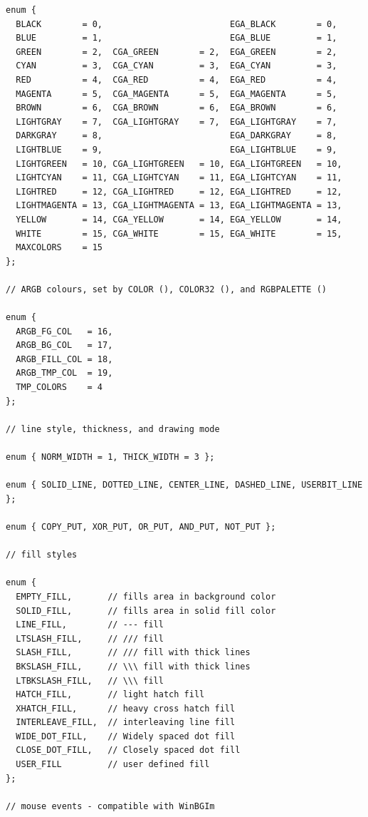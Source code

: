 \documentclass[a4paper,12pt]{article}
\begin{document}
\begin{small}
\begin{spacing}{0.85}
\begin{verbatim}
enum {
  BLACK        = 0,                         EGA_BLACK        = 0,
  BLUE         = 1,                         EGA_BLUE         = 1,
  GREEN        = 2,  CGA_GREEN        = 2,  EGA_GREEN        = 2,
  CYAN         = 3,  CGA_CYAN         = 3,  EGA_CYAN         = 3,
  RED          = 4,  CGA_RED          = 4,  EGA_RED          = 4,
  MAGENTA      = 5,  CGA_MAGENTA      = 5,  EGA_MAGENTA      = 5,
  BROWN        = 6,  CGA_BROWN        = 6,  EGA_BROWN        = 6,
  LIGHTGRAY    = 7,  CGA_LIGHTGRAY    = 7,  EGA_LIGHTGRAY    = 7,
  DARKGRAY     = 8,                         EGA_DARKGRAY     = 8,
  LIGHTBLUE    = 9,                         EGA_LIGHTBLUE    = 9,
  LIGHTGREEN   = 10, CGA_LIGHTGREEN   = 10, EGA_LIGHTGREEN   = 10,
  LIGHTCYAN    = 11, CGA_LIGHTCYAN    = 11, EGA_LIGHTCYAN    = 11,
  LIGHTRED     = 12, CGA_LIGHTRED     = 12, EGA_LIGHTRED     = 12,
  LIGHTMAGENTA = 13, CGA_LIGHTMAGENTA = 13, EGA_LIGHTMAGENTA = 13,
  YELLOW       = 14, CGA_YELLOW       = 14, EGA_YELLOW       = 14,
  WHITE        = 15, CGA_WHITE        = 15, EGA_WHITE        = 15,
  MAXCOLORS    = 15
};

// ARGB colours, set by COLOR (), COLOR32 (), and RGBPALETTE ()

enum {
  ARGB_FG_COL   = 16,
  ARGB_BG_COL   = 17,
  ARGB_FILL_COL = 18,
  ARGB_TMP_COL  = 19,
  TMP_COLORS    = 4
};

// line style, thickness, and drawing mode

enum { NORM_WIDTH = 1, THICK_WIDTH = 3 };

enum { SOLID_LINE, DOTTED_LINE, CENTER_LINE, DASHED_LINE, USERBIT_LINE };

enum { COPY_PUT, XOR_PUT, OR_PUT, AND_PUT, NOT_PUT };

// fill styles

enum {
  EMPTY_FILL,       // fills area in background color
  SOLID_FILL,       // fills area in solid fill color
  LINE_FILL,        // --- fill
  LTSLASH_FILL,     // /// fill
  SLASH_FILL,       // /// fill with thick lines
  BKSLASH_FILL,     // \\\ fill with thick lines
  LTBKSLASH_FILL,   // \\\ fill
  HATCH_FILL,       // light hatch fill
  XHATCH_FILL,      // heavy cross hatch fill
  INTERLEAVE_FILL,  // interleaving line fill
  WIDE_DOT_FILL,    // Widely spaced dot fill
  CLOSE_DOT_FILL,   // Closely spaced dot fill
  USER_FILL         // user defined fill
};

// mouse events - compatible with WinBGIm


\end{verbatim}
\end{spacing}
\end{small}
\end{document}
